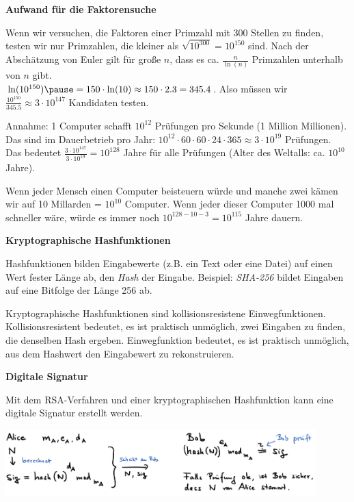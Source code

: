 \begin{frame}[fragile]

\textbf{Aufwand für die Faktorensuche} \pause

Wenn wir versuchen, die Faktoren einer Primzahl mit 300 Stellen zu finden, testen wir nur Primzahlen, die kleiner als
$\sqrt{10^{300}} = 10^{150}$ sind. \pause Nach der Abschätzung von Euler gilt für große $n$, dass es ca. $\frac{n}{\ln(n)}$ Primzahlen unterhalb von $n$ gibt. \\ \pause
$\ln(10^{150}) \pause = 150 \cdot \ln(10) \approx 150 \cdot 2.3 = 345.4$. \pause Also müssen wir $\frac{10^{150}}{345.5} \approx 3 \cdot 10^{147}$ Kandidaten testen. \pause

Annahme: 1 Computer schafft $10^{12}$ Prüfungen pro Sekunde (1 Million Millionen). \pause Das sind im Dauerbetrieb pro Jahr: 
$10^{12} \cdot 60 \cdot 60 \cdot 24 \cdot 365 \approx 3 \cdot 10^{19}$ Prüfungen. \pause Das bedeutet  
$\frac{3 \cdot 10^{147}}{3 \cdot 10^{19}} = 10^{128}$ Jahre für alle Prüfungen (Alter des Weltalls: ca. $10^{10}$ Jahre). \pause

Wenn jeder Mensch einen Computer beisteuern würde und manche zwei kämen wir auf 10 Millarden = $10^{10}$ Computer. \pause Wenn jeder dieser Computer 1000 mal schneller wäre, würde es immer noch $10^{128-10-3} = 10^{115}$ Jahre dauern.
\end{frame}

\begin{frame}[fragile]

\textbf{Kryptographische Hashfunktionen} \pause

Hashfunktionen bilden Eingabewerte (z.B. ein Text oder eine Datei) auf einen Wert fester Länge ab, den \textit{Hash} der Eingabe. \pause Beispiel: \textit{SHA-256} bildet Eingaben auf eine Bitfolge der Länge 256 ab. \pause

Kryptographische Hashfunktionen sind kollisionsresistene Einwegfunktionen. \pause Kollisionsresistent bedeutet, es ist praktisch unmöglich, zwei Eingaben zu finden, die denselben Hash ergeben. \pause Einwegfunktion bedeutet, es ist praktisch unmöglich, aus dem Hashwert den Eingabewert zu rekonstruieren.

\end{frame}

\begin{frame}[fragile]

\textbf{Digitale Signatur}

Mit dem RSA-Verfahren und einer kryptographischen Hashfunktion kann eine digitale Signatur erstellt werden. \pause

\includegraphics[width=12cm]{bild4.png}
\end{frame}


